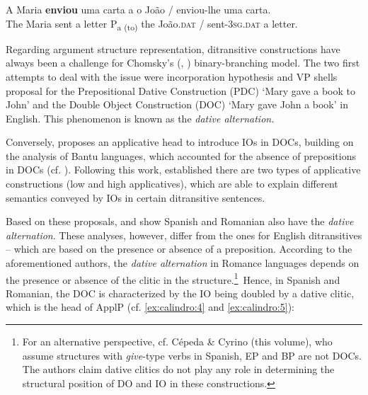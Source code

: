 \documentclass[output=paper,colorlinks,citecolor=brown,nonflat]{./langscibook}
\begin{document}
\ea%
    \label{ex:calindro:3}
    \gll A    Maria \textbf{enviou} uma carta a o {João}            / enviou-{lhe}          uma carta.\\
    The Maria sent     a letter      P{\textsubscript{a (to)}} the João.\textsc{dat}  / sent-\textsc{3sg.dat}  a letter.\\
    \z

Regarding argument structure representation, ditransitive constructions have always been a challenge for Chomsky’s (\citeyear{Chomsky1981}, \citeyear{Chomsky1986}) binary-branching model. The two first attempts to deal with the issue were  incorporation hypothesis and  VP shells proposal for the Prepositional Dative Construction (PDC) ‘Mary gave a book to John’ and the Double Object Construction (DOC) ‘Mary gave John a book’ in English. This phenomenon is known as the \textit{dative alternation.} 

Conversely, \citet{Marantz1993} proposes an applicative head to introduce IOs in DOCs, building on the analysis of Bantu languages, which accounted for the absence of prepositions in DOCs (cf. \citealt{AlsinaMchombo1993}). Following this work, \citet{Pylkkänen2002} established there are two types of applicative constructions (low and high applicatives), which are able to explain different semantics conveyed by IOs in certain ditransitive sentences. 

Based on these proposals, \citet{Cuervo2003} and \citet{DiaconescuRivero2007} show Spanish and Romanian also have the \textit{dative alternation}. These analyses, however, differ from the ones for English ditransitives – which are based on the presence or absence of a preposition. According to the aforementioned authors, the \textit{dative alternation} in Romance languages depends on the presence or absence of the clitic in the structure.\footnote{For an alternative perspective, cf. Cépeda \& Cyrino (this volume), who assume structures with \textit{give}-type verbs in Spanish, EP and BP are not DOCs. The authors claim dative clitics do not play any role in determining the structural position of DO and IO in these constructions.}~Hence, in Spanish and Romanian, the DOC is characterized by the IO being doubled by a dative clitic, which is the head of ApplP (cf. \ref{ex:calindro:4} and \ref{ex:calindro:5}):
\end{document}
